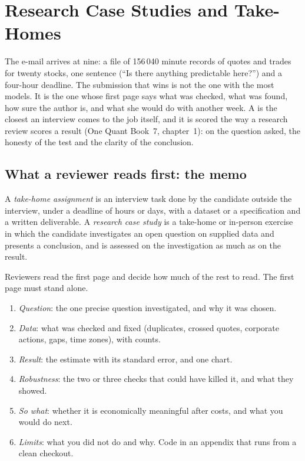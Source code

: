 \chapter{Research Case Studies and Take-Homes}\label{ch:iv:research-case-studies-and-take-homes}

The e-mail arrives at nine: a file of 156\,040 minute records of quotes and trades for twenty stocks, one sentence (``Is
there anything predictable here?'') and a four-hour deadline. The submission that wins is not the one with the most models.
It is the one whose first page says what was checked, what was found, how sure the author is, and what she would do with
another week. A  is the closest an interview comes to the job itself, and it is scored the way a research
review scores a result (One Quant Book~7, chapter~1): on the question asked, the honesty of the test and the clarity of the
conclusion.

\section{What a reviewer reads first: the memo}

\begin{definition}\label{def:iv:research-case-studies-and-take-homes:takehome}
A \emph{take-home assignment} is an interview task done by the candidate outside the interview,
under a deadline of hours or days, with a dataset or a specification and a written deliverable. A \emph{research case
study} is a take-home or in-person exercise in which the candidate investigates an open question on
supplied data and presents a conclusion, and is assessed on the investigation as much as on the result.
\end{definition}

Reviewers read the first page and decide how much of the rest to read. The first page must stand alone.

\begin{method}\label{met:iv:research-case-studies-and-take-homes:memo}
\begin{enumerate}
\item \emph{Question}: the one precise question investigated, and why it was chosen.
\item \emph{Data}: what was checked and fixed (duplicates, crossed quotes, corporate actions, gaps, time zones), with counts.
\item \emph{Result}: the estimate with its standard error, and one chart.
\item \emph{Robustness}: the two or three checks that could have killed it, and what they showed.
\item \emph{So what}: whether it is economically meaningful after costs, and what you would do next.
\item \emph{Limits}: what you did not do and why. Code in an appendix that runs from a clean checkout.
\end{enumerate}
\end{method}

